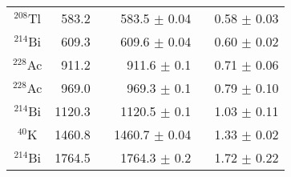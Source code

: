 \begin{table}
\begin{tabular}{  c | r | r | c  }
					$^{208}$Tl     & 583.2     ~ & 583.5      ${\pm}$ 0.04       ~ & 0.58       ${\pm}$ 0.03       \\
					$^{214}$Bi     & 609.3     ~ & 609.6      ${\pm}$ 0.04       ~ & 0.60       ${\pm}$ 0.02       \\
					$^{228}$Ac     & 911.2     ~ & 911.6      ${\pm}$ 0.1       ~ & 0.71       ${\pm}$ 0.06       \\
					$^{228}$Ac     & 969.0     ~ & 969.3      ${\pm}$ 0.1       ~ & 0.79       ${\pm}$ 0.10       \\
					$^{214}$Bi     & 1120.3    ~ & 1120.5     ${\pm}$ 0.1       ~ & 1.03       ${\pm}$ 0.11       \\
					$^{40}$K       & 1460.8    ~ & 1460.7     ${\pm}$ 0.04       ~ & 1.33       ${\pm}$ 0.02       \\
					$^{214}$Bi     & 1764.5    ~ & 1764.3     ${\pm}$ 0.2       ~ & 1.72       ${\pm}$ 0.22       \\

\end{tabular}
\end{table}
